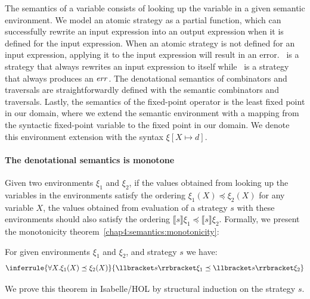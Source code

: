 The semantics of a variable consists of looking up the variable in a given semantic environment. We model an atomic strategy as a partial function, which can successfully rewrite an input expression into an output expression when it is defined for the input expression. When an atomic strategy is not defined for an input expression, applying it to the input expression will result in an error. \sskip~is a strategy that always rewrites an input expression to itself while \sabort~is a strategy that always produces an $\mathit{err}$. The denotational semantics of combinators and traversals are straightforwardly defined with the
semantic combinators and traversals. Lastly, the semantics of the fixed-point operator is the least fixed point in our domain, where we extend the semantic environment with a mapping from the syntactic fixed-point variable to the fixed point in our domain. We denote this environment extension with the syntax $\xi[X \mapsto d]$.

\paragraph*{The denotational semantics is monotone} Given two environments $\xi_1$ and $\xi_2$, if the values obtained from looking up the variables in the environments satisfy the ordering $\xi_1(X) \preceq \xi_2(X)$ for any variable $X$, the values obtained from evaluation of a strategy $s$ with these environments should also satisfy the ordering $\llbracket s \rrbracket\xi_1 \preceq \llbracket s \rrbracket\xi_2$. Formally, we present the monotonicity theorem~\ref{chap4:semantics:monotonicity}:
\begin{theorem}
For given environments $\xi_1$ and $\xi_2$, and strategy $s$ we have:
\vspace{-1.0em}
\begin{align*}
    \inferrule{\forall X. \xi_1(X) \preceq \xi_2(X)}{\llbracket s \rrbracket\xi_1 \preceq \llbracket s \rrbracket\xi_2}
\end{align*}
\label{chap4:semantics:monotonicity}
\end{theorem}
\vspace{-1.0em}
We prove this theorem in Isabelle/HOL by structural induction on the strategy $s$.

